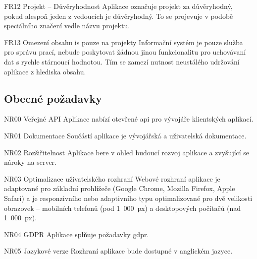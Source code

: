 \begin{dl}
   \item[FR12 Projekt -- Důvěryhodnost]
   Aplikace označuje projekt za důvěryhodný, pokud alespoň jeden z vedoucích je důvěryhodný. To se projevuje v podobě speciálního značení vedle názvu projektu.

   \item[FR13 Omezení obsahu \gls{is} pouze na projekty]
   Informační systém je pouze služba pro správu prací, nebude poskytovat žádnou jinou funkcionalitu pro uchovávaní dat s rychle stárnoucí hodnotou. Tím se zamezí nutnost neustálého udržování aplikace z hlediska obsahu.

\end{dl}


\subsection{Obecné požadavky}

\begin{dl}
   \item[NR00 Veřejné API]
   Aplikace nabízí otevřené \gls{api} pro vývojáře klientských aplikací.

   \item[NR01 Dokumentace]
   Součástí aplikace je vývojářská a uživatelská dokumentace.

   \item[NR02 Rozšiřitelnost]
   Aplikace bere v ohled budoucí rozvoj aplikace a zvyšující se nároky na server.

   \item[NR03 Optimalizace uživatelského rozhraní]
   Webové rozhraní aplikace je adaptované pro základní prohlížeče (Google Chrome, Mozilla Firefox, Apple Safari) a je responzivního nebo adaptivního typu optimalizované pro dvě velikosti obrazovek -- mobilních telefonů (pod 1~000~px) a desktopových počítačů (nad 1~000~px).

   \newpage
   \item[NR04 GDPR] 
   Aplikace splňuje požadavky \gls{gdpr}.

   \item[NR05 Jazykové verze] 
   Rozhraní aplikace bude dostupné v anglickém jazyce.
\end{dl}
